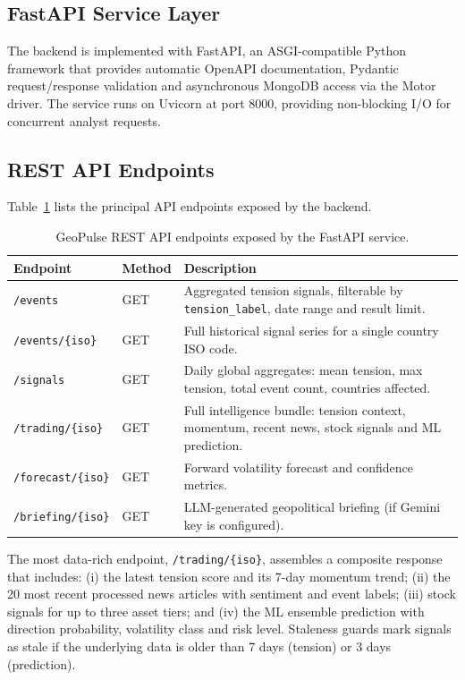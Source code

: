 \documentclass[12pt,a4paper]{report}
\begin{document}
\subsection{FastAPI Service Layer}

The backend is implemented with FastAPI, an ASGI-compatible Python
framework that provides automatic OpenAPI documentation, Pydantic
request/response validation and asynchronous MongoDB access via the
Motor driver. The service runs on Uvicorn at port 8000, providing
non-blocking I/O for concurrent analyst requests.

\subsection{REST API Endpoints}

Table~\ref{tab:endpoints} lists the principal API endpoints exposed
by the backend.

\begin{table}[H]
\centering
\caption{GeoPulse REST API endpoints exposed by the FastAPI service.}
\label{tab:endpoints}
\begin{tabular}{p{4.5cm}p{2.0cm}p{6.5cm}}
\toprule
\textbf{Endpoint} & \textbf{Method} & \textbf{Description} \\
\midrule
\texttt{/events}
  & GET
  & Aggregated tension signals, filterable by
    \texttt{tension\_label}, date range and result limit. \\
\addlinespace[4pt]
\texttt{/events/\{iso\}}
  & GET
  & Full historical signal series for a single country
    ISO code. \\
\addlinespace[4pt]
\texttt{/signals}
  & GET
  & Daily global aggregates: mean tension, max tension,
    total event count, countries affected. \\
\addlinespace[4pt]
\texttt{/trading/\{iso\}}
  & GET
  & Full intelligence bundle: tension context, momentum,
    recent news, stock signals and ML prediction. \\
\addlinespace[4pt]
\texttt{/forecast/\{iso\}}
  & GET
  & Forward volatility forecast and confidence metrics. \\
\addlinespace[4pt]
\texttt{/briefing/\{iso\}}
  & GET
  & LLM-generated geopolitical briefing (if Gemini key
    is configured). \\
\bottomrule
\end{tabular}
\end{table}

The most data-rich endpoint, \texttt{/trading/\{iso\}}, assembles a
composite response that includes: (i) the latest tension score and its
7-day momentum trend; (ii) the 20 most recent processed news articles
with sentiment and event labels; (iii) stock signals for up to three
asset tiers; and (iv) the ML ensemble prediction with direction
probability, volatility class and risk level. Staleness guards mark
signals as stale if the underlying data is older than 7 days (tension)
or 3 days (prediction).
\end{document}
